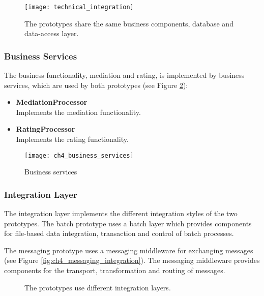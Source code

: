 \begin{figure}[htbp]
	\centering
	\texttt{[image: technical\_integration]}
	\caption{The prototypes share the same business components, database and data-access layer.}
	\label{fig:ch4_technical_integration}
\end{figure}


\subsubsection{Business Services}

The business functionality, mediation and rating, is implemented by business services, which are used by both prototypes (see Figure \ref{fig:ch4_business_services}):

\begin{itemize}
	\item \textbf{MediationProcessor}\\
	Implements the mediation functionality.
	\item \textbf{RatingProcessor}\\
	Implements the rating functionality.
\end{itemize}

\begin{figure}[htbp]
	\centering
	\texttt{[image: ch4\_business\_services]}
	\caption{Business services}
	\label{fig:ch4_business_services}
\end{figure}

\subsubsection{Integration Layer}

The integration layer implements the different integration styles of the two prototypes. The batch prototype uses a batch layer which provides components for file-based data integration, transaction and control of batch processes.

The messaging prototype uses a messaging middleware for exchanging messages (see Figure \ref{fig:ch4_messaging_integration}). The messaging middleware provides components for the transport, transformation and routing of messages.

\begin{figure}[htbp]
	\centering
	\qquad
	\caption{The prototypes use different integration layers.}
\end{figure}

